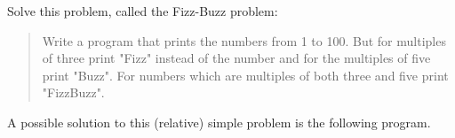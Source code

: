 \begin{Exercise}[title={FizzBuzz},difficulty=1]
\label{ex:fizzbuzz}
\Question \label{ex:fizzbuzz q1} Solve this problem, called
the Fizz-Buzz \cite{fizzbuzz} problem:
\begin{quote}
Write a program that prints the numbers from 1 to 100. But for multiples
of three print "Fizz" instead of the number and for the multiples of
five print "Buzz". For numbers which are multiples of both three and
five print "FizzBuzz".
\end{quote}
\end{Exercise}

\begin{Answer}
\Question A possible
solution to this (relative) simple problem is the following program.

\end{Answer}
